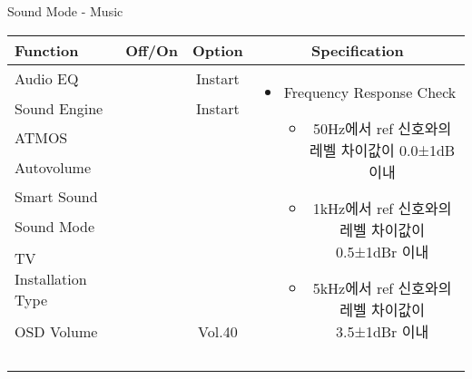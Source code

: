 \begin{frame}[t]{Sound Mode - Music}
\begin{tiny}
\begin{tabular}{@{}lccc@{}}
\toprule
Function & Off/On & Option & Specification \\
\midrule
Audio EQ & \color{black}{Off} & Instart &
\multirow{10}{60mm}{
\begin{itemize}
\item Frequency Response Check
	\begin{itemize}	
		\item 50Hz에서 ref 신호와의 레벨 차이값이 0.0±1dB 이내		
	\item 1kHz에서 ref 신호와의 레벨 차이값이 0.5±1dBr 이내
	\item 5kHz에서 ref 신호와의 레벨 차이값이 3.5±1dBr 이내	
	\end{itemize}
\end{itemize}
} \\
Sound Engine & \color{blue}{On} & Instart & \\
ATMOS & \color{black}{Off}  & & \\
Autovolume & \color{black}{Off} & & \\
Smart Sound & \color{black}{Off} & & \\
Sound Mode & \color{blue}{On} & \color{blue}{Music} & \\
TV Installation Type & \color{blue}{On} & \color{black}{Standtype1} & \\
OSD Volume & \color{blue}{On} & Vol.40 & \\
& & & \\
& & & \\
& & & \\
& & & \\
\midrule
\end{tabular}
\end{tiny}


\end{frame}
